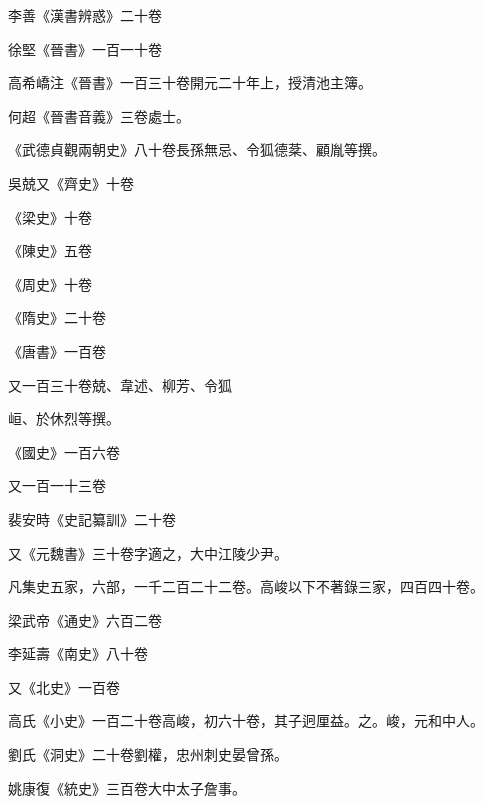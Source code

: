 \begin{pinyinscope}
 李善《漢書辨惑》二十卷



 徐堅《晉書》一百一十卷



 高希嶠注《晉書》一百三十卷開元二十年上，授清池主簿。



 何超《晉書音義》三卷處士。



 《武德貞觀兩朝史》八十卷長孫無忌、令狐德棻、顧胤等撰。



 吳兢又《齊史》十卷



 《梁史》十卷



 《陳史》五卷



 《周史》十卷



 《隋史》二十卷



 《唐書》一百卷



 又一百三十卷兢、韋述、柳芳、令狐



 峘、於休烈等撰。



 《國史》一百六卷



 又一百一十三卷



 裴安時《史記纂訓》二十卷



 又《元魏書》三十卷字適之，大中江陵少尹。



 凡集史五家，六部，一千二百二十二卷。高峻以下不著錄三家，四百四十卷。



 梁武帝《通史》六百二卷



 李延壽《南史》八十卷



 又《北史》一百卷



 高氏《小史》一百二十卷高峻，初六十卷，其子迥厘益。之。峻，元和中人。



 劉氏《洞史》二十卷劉權，忠州刺史晏曾孫。



 姚康復《統史》三百卷大中太子詹事。




\end{pinyinscope}
